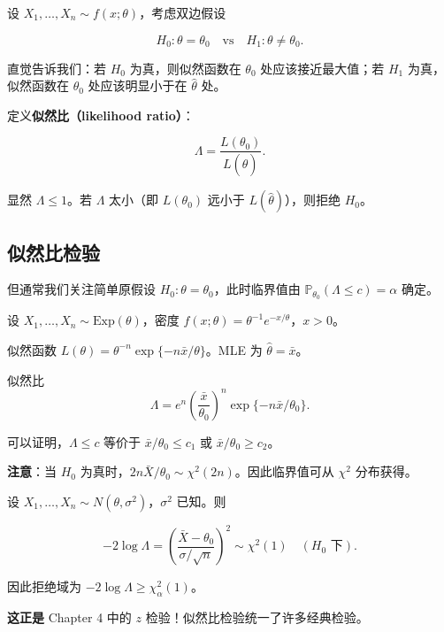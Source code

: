 设 $X_1, \ldots, X_n \sim f(x;\theta)$，考虑双边假设

\[
H_0: \theta = \theta_0 \quad \text{vs} \quad H_1: \theta \neq \theta_0.
\label{eq:simple-hypothesis-test}
\]

直觉告诉我们：若 $H_0$ 为真，则似然函数在 $\theta_0$ 处应该接近最大值；若 $H_1$ 为真，似然函数在 $\theta_0$ 处应该明显小于在 $\widehat{\theta}$ 处。

定义\textbf{似然比（likelihood ratio）}：

\[
\Lambda = \frac{L(\theta_0)}{L(\widehat{\theta})}.
\label{eq:likelihood-ratio}
\]

显然 $\Lambda \leq 1$。若 $\Lambda$ 太小（即 $L(\theta_0)$ 远小于 $L(\widehat{\theta})$），则拒绝 $H_0$。

\subsection{似然比检验}


但通常我们关注简单原假设 $H_0: \theta = \theta_0$，此时临界值由 $\mathbb{P}_{\theta_0}(\Lambda \leq c) = \alpha$ 确定。

\begin{example}\label{ex:exponential-lrt}
设 $X_1, \ldots, X_n \sim \text{Exp}(\theta)$，密度 $f(x;\theta) = \theta^{-1}e^{-x/\theta}$，$x > 0$。

似然函数 $L(\theta) = \theta^{-n}\exp\{-n\bar{x}/\theta\}$。MLE 为 $\widehat{\theta} = \bar{x}$。

似然比
\[
\Lambda = e^n \left(\frac{\bar{x}}{\theta_0}\right)^n \exp\{-n\bar{x}/\theta_0\}.
\]

可以证明，$\Lambda \leq c$ 等价于 $\bar{x}/\theta_0 \leq c_1$ 或 $\bar{x}/\theta_0 \geq c_2$。

\textbf{注意}：当 $H_0$ 为真时，$2n\bar{X}/\theta_0 \sim \chi^2(2n)$。因此临界值可从 $\chi^2$ 分布获得。
\end{example}

\begin{example}\label{ex:normal-lrt}
设 $X_1, \ldots, X_n \sim N(\theta, \sigma^2)$，$\sigma^2$ 已知。则

\[
-2\log\Lambda = \left( \frac{\bar{X} - \theta_0}{\sigma/\sqrt{n}} \right)^2 \sim \chi^2(1) \quad (H_0 \text{ 下}).
\]

因此拒绝域为 $-2\log\Lambda \geq \chi_\alpha^2(1)$。

\textbf{这正是} Chapter 4 中的 $z$ 检验！似然比检验统一了许多经典检验。
\end{example}

